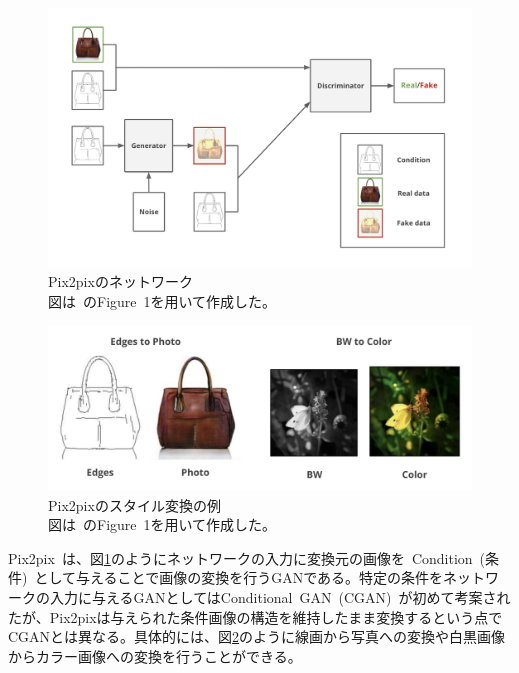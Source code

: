\begin{figure}[b]
\begin{center}
\includegraphics[width=\hsize]{figure/pix2pix_net.png}
\caption{Pix2pixのネットワーク\\
図は~\cite{pix2pix}のFigure~1を用いて作成した。}
\label{fig:pix2pix_net}
\end{center}
\end{figure}

\begin{figure}[t]
\begin{center}
\includegraphics[width=\hsize]{figure/pix2pix_img.png}
\caption{Pix2pixのスタイル変換の例\\
図は~\cite{pix2pix}のFigure~1を用いて作成した。}
\label{fig:pix2pix_img}
\end{center}
\end{figure}

Pix2pix~\cite{pix2pix}は、図\ref{fig:pix2pix_net}のようにネットワークの入力に変換元の画像を~Condition~(条件)~として与えることで画像の変換を行うGANである。特定の条件をネットワークの入力に与えるGANとしてはConditional~GAN~(CGAN)~\cite{CGAN}が初めて考案されたが、Pix2pixは与えられた条件画像の構造を維持したまま変換するという点でCGANとは異なる。具体的には、図\ref{fig:pix2pix_img}のように線画から写真への変換や白黒画像からカラー画像への変換を行うことができる。

